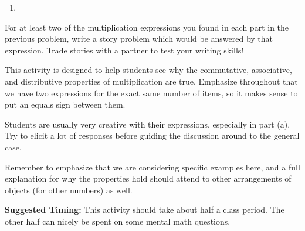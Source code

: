 \documentclass{ximera}
\begin{document}
\begin{problem}
\begin{enumerate}
{\begin{tabular}{p{0.5cm}p{0.5cm}p{0.5cm}p{0.5cm}p{0.5cm}p{0.5cm}p{0.5cm}p{0.5cm}p{0.5cm}p{0.5cm}p{0.5cm}}
        \end{tabular} }
    \item \leavevmode\vadjust{\vspace{-\baselineskip}}
\end{enumerate}
\end{problem}

\begin{problem}
 For at least two of the multiplication expressions you found in each part in the previous problem, write a story problem which would be answered by that expression.  Trade stories with a partner to test your writing skills!
\end{problem}

\newpage
\begin{instructorNotes}
This activity is designed to help students see why the commutative, associative, and distributive properties of multiplication are true.  Emphasize throughout that we have two expressions for the exact same number of items, so it makes sense to put an equals sign between them.  

Students are usually very creative with their expressions, especially in part (a).  Try to elicit a lot of responses before guiding the discussion around to the general case.  

Remember to emphasize that we are considering specific examples here, and a full explanation for why the properties hold should attend to other arrangements of objects (for other numbers) as well.

{\bf Suggested Timing:} This activity should take about half a class period.  The other half can nicely be spent on some mental math questions.
\end{instructorNotes}
\end{document}
